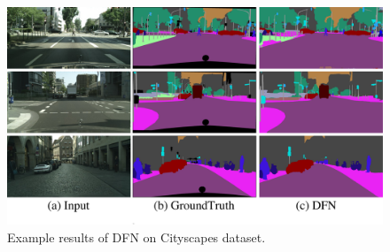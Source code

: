 \documentclass[10pt,twocolumn,letterpaper]{article}
\begin{document}
\begin{figure}[t]
	\centering
	\includegraphics[width=\linewidth]{res-city.pdf}
	\caption{Example results of DFN on Cityscapes dataset.}
	\label{fig:res-city}
\end{figure}
 
\end{document}
